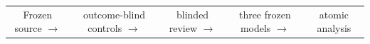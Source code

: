 \begin{tabular}{ccccc}
Frozen source $\rightarrow$ & outcome-blind controls $\rightarrow$ & blinded review $\rightarrow$ &
three frozen models $\rightarrow$ & atomic analysis \\
\end{tabular}
